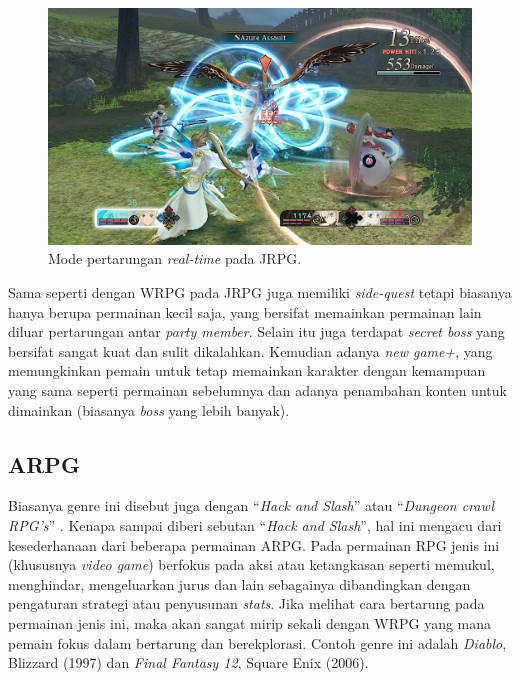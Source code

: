 \begin{figure} [!h] \centering
	\includegraphics[scale=0.29]{img/tales.png}
	\caption{Mode pertarungan \textit{real-time} pada JRPG.}
	\label{fig:tales}
\end{figure}

Sama seperti dengan WRPG pada JRPG juga memiliki \textit{side-quest} tetapi biasanya hanya berupa permainan kecil saja, yang bersifat memainkan permainan lain diluar pertarungan antar \textit{party member}. Selain itu juga terdapat \textit{secret boss} yang bersifat sangat kuat dan sulit dikalahkan. Kemudian adanya \textit{new game+}, yang memungkinkan pemain untuk tetap memainkan karakter dengan kemampuan yang sama seperti permainan sebelumnya dan adanya penambahan konten untuk dimainkan (biasanya \textit{boss} yang lebih banyak).
\vspace{1ex}

\subsection{ARPG}
\label{sec:sub_sec2_arpg}

Biasanya genre ini disebut juga dengan ``\textit{Hack and Slash}'' atau ``\textit{Dungeon crawl RPG's}'' \citep{moore2016}. Kenapa sampai diberi sebutan ``\textit{Hack and Slash}'', hal ini mengacu dari kesederhanaan dari beberapa permainan ARPG. Pada permainan RPG jenis ini (khususnya \textit{video game}) berfokus pada aksi atau ketangkasan seperti memukul, menghindar, mengeluarkan jurus dan lain sebagainya dibandingkan dengan pengaturan strategi atau penyusunan \textit{stats}. Jika melihat cara bertarung pada permainan jenis ini, maka akan sangat mirip sekali dengan WRPG yang mana pemain fokus dalam bertarung dan berekplorasi. Contoh genre ini adalah \textit{Diablo}, Blizzard (1997) dan \textit{Final Fantasy 12}, Square Enix (2006).
\vspace{1ex}

